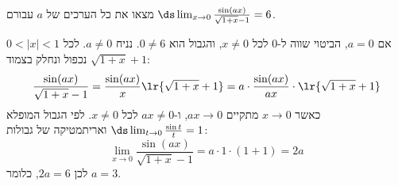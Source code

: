 מצאו את כל הערכים של $a$ עבורם $\ds\lim_{x\to0}\frac{\sin(ax)}{\sqrt{1+x}-1}=6$.
\ifsol
{}
\begin{solbox}
אם $a=0$, הביטוי שווה ל-$0$ לכל $x\ne0$, והגבול הוא $0\ne6$. נניח $a\ne0$. לכל $0<|x|<1$ נכפול ונחלק בצמוד $\sqrt{1+x}+1$:
\[\frac{\sin(ax)}{\sqrt{1+x}-1}=\frac{\sin(ax)}{x}\lr{\sqrt{1+x}+1}=a\cdot\frac{\sin(ax)}{ax}\cdot\lr{\sqrt{1+x}+1}\]
כאשר $x\to0$ מתקיים $ax\to0$, ו-$ax\ne0$ לכל $x\ne0$. לפי הגבול המופלא $\ds\lim_{t\to0}\frac{\sin t}{t}=1$ ואריתמטיקה של גבולות:
\[\lim_{x\to0}\frac{\sin(ax)}{\sqrt{1+x}-1}=a\cdot1\cdot(1+1)=2a\]
לכן $2a=6$, כלומר $a=3$.
\end{solbox}
\fi

